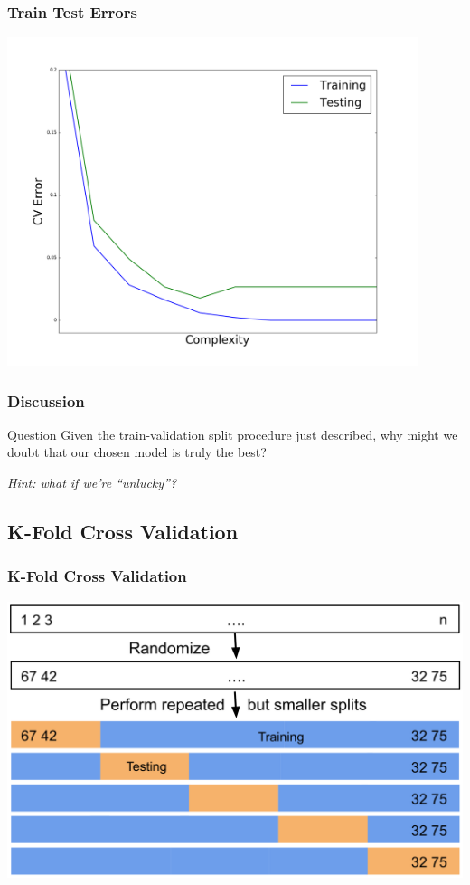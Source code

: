 \documentclass{beamer}
\begin{document}
\begin{frame}
  \frametitle{Train Test Errors}
  \begin{center}
    \includegraphics[width=0.9\textwidth]{images/train_test_error.png}
  \end{center}
\end{frame}

\begin{frame}
  \frametitle{Discussion}
  \begin{block}{Question}
    Given the train-validation split procedure just described, why might we doubt that our chosen model is truly the best?
  \end{block} \vspace{4mm} \pause
  \textit{Hint: what if we're ``unlucky''?}
\end{frame}

\subsection{K-Fold Cross Validation}
\begin{frame}
  \frametitle{K-Fold Cross Validation}
  \includegraphics[width=\textwidth]{images/k_fold_split.png}
\end{frame}
\end{document}
